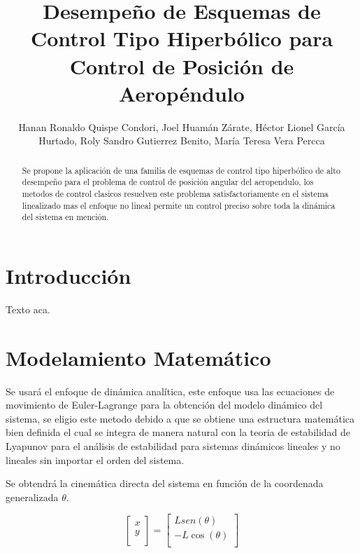 \documentclass[a4paper]{IEEEtran} %
\begin{document}
\title{Desempeño de Esquemas de Control Tipo Hiperbólico para Control de Posición de Aeropéndulo}
\author{Hanan Ronaldo Quispe Condori, Joel Huamán Zárate, Héctor Lionel García Hurtado, Roly Sandro Gutierrez Benito, María Teresa Vera Percca}
\maketitle
\begin{abstract}
    Se propone la aplicación de una familia de esquemas de control tipo hiperbólico de alto desempeño para el problema de control de posición angular del aeropendulo, los metodos de control clasicos resuelven este problema satisfactoriamente en el sistema linealizado mas el enfoque no lineal permite un control preciso sobre toda la dinámica del sistema en mención.
\end{abstract}
\section{Introducción}
Texto aca\cite{gunnel2017tuning}.
\section{Modelamiento Matemático}
\label{sec:modeling}
Se usará el enfoque de dinámica analítica, este enfoque usa las ecuaciones de movimiento de Euler-Lagrange para la obtención del modelo dinámico del sistema, se eligio este metodo debido a que se obtiene una estructura matemática bien definida el cual se integra de manera natural con la teoria de estabilidad de Lyapunov para el análisis de estabilidad para sistemas dinámicos lineales y no lineales sin importar el orden del sistema.\cite{reyes2019drones}

Se obtendrá la cinemática directa del sistema en función de la coordenada generalizada $\theta$.

\begin{equation}
    \begin{bmatrix}  x \\ y \\
    \end{bmatrix}=
    \begin{bmatrix} Lsen(\theta) \\ -L\cos(\theta)  \\
    \end{bmatrix}
    \label{eq:cin_direc}
\end{equation}
\end{document}
